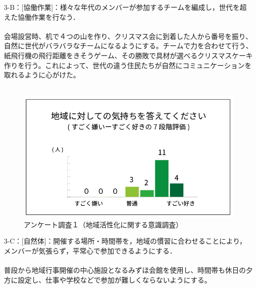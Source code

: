 \documentclass[a4paper]{jsarticle}
\begin{document}
3-B：[協働作業]：様々な年代のメンバーが参加するチームを編成し，世代を超えた協働作業を行なう．\\\\
会場設営時、机で４つの山を作り、クリスマス会に到着した人から番号を振り、自然に世代がバラバラなチームになるようにする。チームで力を合わせて行う、紙飛行機の飛行距離をきそうゲーム、その勝敗で具材が選べるクリスマスケーキ作りを行う。これによって、世代の違う住民たちが自然にコミュニケーションを取れるように心がけた。\\\\
\begin{figure}[h]
  \begin{center}
    \includegraphics[width=0.95\hsize]{./images/03}
    \caption{アンケート調査１（地域活性化に関する意識調査）}
    \label{fig:tmu_hino}
  \end{center}
\end{figure}
3-C：[自然体]：開催する場所・時間帯を，地域の慣習に合わせることにより，メンバーが気張らず，平常心で参加できるようにする．\\\\
普段から地域行事開催の中心施設となるみずほ会館を使用し、時間帯も休日の夕方に設定し、仕事や学校などで参加が難しくならないようにする。

\\\\
\end{document}
